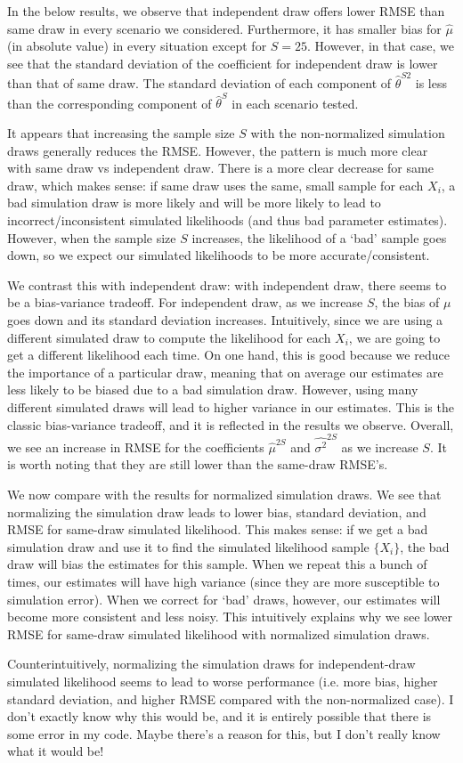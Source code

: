 \documentclass[12pt]{article}
\begin{document}
In the below results, we observe that independent draw offers lower RMSE than same draw in every scenario we considered. Furthermore, it has smaller bias for $\hat{\mu}$ (in absolute value) in every situation except for $S = 25$. However, in that case, we see that the standard deviation of the coefficient for independent draw is lower than that of same draw. The standard deviation of each component of $\hat{\theta}^{S2}$ is less than the corresponding component of $\hat{\theta}^S$ in each scenario tested.

It appears that increasing the sample size $S$ with the non-normalized simulation draws generally reduces the RMSE. However, the pattern is much more clear with same draw vs independent draw. There is a more clear decrease for same draw, which makes sense: if same draw uses the same, small sample for each $X_i$, a bad simulation draw is more likely and will be more likely to lead to incorrect/inconsistent simulated likelihoods (and thus bad parameter estimates). However, when the sample size $S$ increases, the likelihood of a `bad' sample goes down, so we expect our simulated likelihoods to be more accurate/consistent.

We contrast this with independent draw: with independent draw, there seems to be a bias-variance tradeoff. For independent draw, as we increase $S$, the bias of $\mu$ goes down and its standard deviation increases. Intuitively, since we are using a different simulated draw to compute the likelihood for each $X_i$, we are going to get a different likelihood each time. On one hand, this is good because we reduce the importance of a particular draw, meaning that on average our estimates are less likely to be biased due to a bad simulation draw. However, using many different simulated draws will lead to higher variance in our estimates. This is the classic bias-variance tradeoff, and it is reflected in the results we observe. Overall, we see an increase in RMSE for the coefficients $\hat{\mu}^{2S}$ and $\hat{\sigma^2}^{2S}$ as we increase $S$. It is worth noting that they are still lower than the same-draw RMSE's. 

We now compare with the results for normalized simulation draws. We see that normalizing the simulation draw leads to lower bias, standard deviation, and RMSE for same-draw simulated likelihood. This makes sense: if we get a bad simulation draw and use it to find the simulated likelihood sample $\{X_i\}$, the bad draw will bias the estimates for this sample. When we repeat this a bunch of times, our estimates will have high variance (since they are more susceptible to simulation error). When we correct for `bad' draws, however, our estimates will become more consistent and less noisy. This intuitively explains why we see lower RMSE for same-draw simulated likelihood with normalized simulation draws.

Counterintuitively, normalizing the simulation draws for independent-draw simulated likelihood seems to lead to worse performance (i.e. more bias, higher standard deviation, and higher RMSE compared with the non-normalized case). I don't exactly know why this would be, and it is entirely possible that there is some error in my code. Maybe there's a reason for this, but I don't really know what it would be!
    
\end{document}
